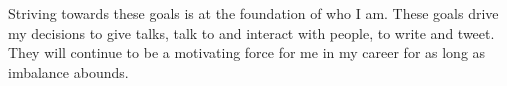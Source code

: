 \documentclass[acmtocl]{acmtrans2m}
\begin{document}
Striving towards these goals is at the foundation of who I am. These goals
drive my decisions to give talks, talk to and interact with people, to write
and tweet. They will continue to be a motivating force for me in my career for
as long as imbalance abounds.

% 
% 
% 

\printbibliography

\end{document}

